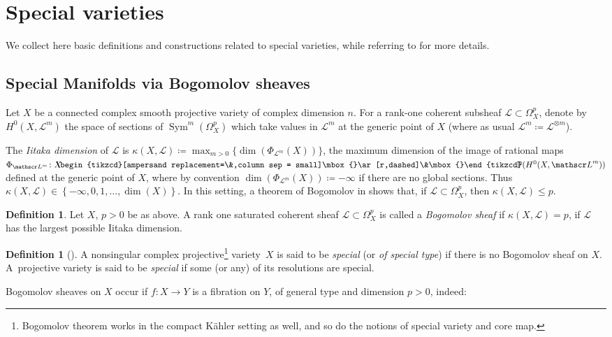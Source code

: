 \documentclass[JEP,XML,SOM,Unicode, NoEqCountersInSection,NoFloatCountersInSection,published]{cedram}
\let\mathcal\mathscr
\DeclareMathOperator{\Sym}{Sym}
\newcommand{\dradpl}{{\hspace*{-2.5mm}\begin{tikzcd}[ampersand replacement=\&,column sep = scriptsize]\mbox{}\ar[r,dashed]\&\mbox{}\end{tikzcd}\hspace*{-2.5mm}}}
\newcommand{\dratst}{{\hspace*{-2.5mm}\begin{tikzcd}[ampersand replacement=\&,column sep = small]\mbox{}\ar[r,dashed]\&\mbox{}\end{tikzcd}\hspace*{-2mm}}}
\let\drascst\dratst
\newcommand{\dra}{\mathchoice{\dradpl}{\dratst}{\drascst}{\drascst}}
\let\dasharrow\dra
\theoremstyle{theorem}
\theoremstyle{definition}
\newtheorem{definition}[proposition]{Definition}
\def\bP{{\mathbb P}}
\newcommand{\calL}{{\mathcal L}}
\newcommand{\bydef}{\coloneqq}
\begin{document}
\section{Special varieties}\label{special}
We collect here basic definitions and constructions related to special varieties, while referring to \cite{Cam04} for more details.

\subsection{Special Manifolds via Bogomolov sheaves}
Let \(X\) be a connected complex smooth projective variety of complex dimension \(n\).
For a rank-one coherent subsheaf \(\calL\subset\Omega^p_X\), denote by \(H^0(X,\calL^{m})\) the space of sections of \(\Sym^m(\Omega^p_X)\) which take values in \(\calL^{m}\) at the generic point of $X$ (where as usual $\calL^m \coloneqq \calL^{\otimes m}$).

The \emph{Iitaka dimension} of $\calL$ is \(\kappa(X,\calL)\bydef\max_{m>0}\{\dim(\Phi_{\calL^m}(X))\}\), \ie the maximum dimension of the image of rational maps
\(\Phi_{\calL^{m}}\colon X\dasharrow\bP(H^0(X,\calL^{m}))\) defined at the generic point of \(X\),
where by convention \(\dim(\Phi_{\calL^{m}}(X))\bydef-\infty\) if there are no global sections.
Thus \(\kappa(X,\calL)\in \left\{-\infty, 0,1,\dotsc, \dim(X)\right\}\).
In this setting, a theorem of Bogomolov in \cite{Bog} shows that, if \(\calL\subset\Omega_{X}^{p}\), then \(\kappa(X,\calL)\leq p\).
\begin{definition}
Let $X$, $p >0$ be as above. A rank one saturated coherent sheaf \(\calL\subset\Omega_{X}^{p}\)
is called a \emph{Bogomolov sheaf} if \(\kappa(X,\calL)=p\), \ie if $\calL$ has the largest possible Iitaka dimension.
\end{definition}

\begin{definition}[{\cite[Def.\,2.1]{Cam04}}]\label{def:special}
A nonsingular complex projective\footnote{Bogomolov theorem works in the compact Kähler setting as well, and so do the notions of special variety and core map.} variety~\(X\) is said to be \emph{special} (or \emph{of special type}) if there is no Bogomolov sheaf on $X$.
A~projective variety is said to be \emph{special} if some (or any) of its resolutions are special.
\end{definition}

Bogomolov sheaves on $X$ occur if $f: X\to Y$ is a fibration on $Y$, of general type and dimension $p>0$, indeed:
\end{document}

